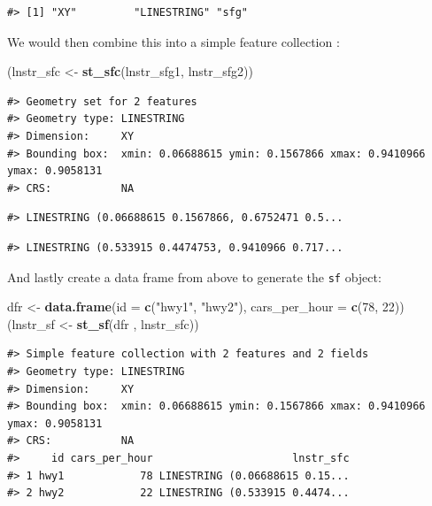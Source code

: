 \documentclass[
]{book}
\newenvironment{Shaded}{\begin{snugshade}}{\end{snugshade}}
\newcommand{\AttributeTok}[1]{\textcolor[rgb]{0.13,0.29,0.53}{#1}}
\newcommand{\DecValTok}[1]{\textcolor[rgb]{0.00,0.00,0.81}{#1}}
\newcommand{\FunctionTok}[1]{\textcolor[rgb]{0.13,0.29,0.53}{\textbf{#1}}}
\newcommand{\NormalTok}[1]{#1}
\newcommand{\OtherTok}[1]{\textcolor[rgb]{0.56,0.35,0.01}{#1}}
\newcommand{\StringTok}[1]{\textcolor[rgb]{0.31,0.60,0.02}{#1}}
\begin{document}
\begin{verbatim}
#> [1] "XY"         "LINESTRING" "sfg"
\end{verbatim}

We would then combine this into a simple feature collection :

\begin{Shaded}
\begin{Highlighting}[]
\NormalTok{(lnstr\_sfc }\OtherTok{\textless{}{-}} \FunctionTok{st\_sfc}\NormalTok{(lnstr\_sfg1, lnstr\_sfg2)) }
\end{Highlighting}
\end{Shaded}

\begin{verbatim}
#> Geometry set for 2 features 
#> Geometry type: LINESTRING
#> Dimension:     XY
#> Bounding box:  xmin: 0.06688615 ymin: 0.1567866 xmax: 0.9410966 ymax: 0.9058131
#> CRS:           NA
\end{verbatim}

\begin{verbatim}
#> LINESTRING (0.06688615 0.1567866, 0.6752471 0.5...
\end{verbatim}

\begin{verbatim}
#> LINESTRING (0.533915 0.4474753, 0.9410966 0.717...
\end{verbatim}

And lastly create a data frame from above to generate the \texttt{sf} object:

\begin{Shaded}
\begin{Highlighting}[]
\NormalTok{dfr }\OtherTok{\textless{}{-}} \FunctionTok{data.frame}\NormalTok{(}\AttributeTok{id =} \FunctionTok{c}\NormalTok{(}\StringTok{"hwy1"}\NormalTok{, }\StringTok{"hwy2"}\NormalTok{), }
                  \AttributeTok{cars\_per\_hour =} \FunctionTok{c}\NormalTok{(}\DecValTok{78}\NormalTok{, }\DecValTok{22}\NormalTok{))}
\NormalTok{(lnstr\_sf }\OtherTok{\textless{}{-}} \FunctionTok{st\_sf}\NormalTok{(dfr , lnstr\_sfc))}
\end{Highlighting}
\end{Shaded}

\begin{verbatim}
#> Simple feature collection with 2 features and 2 fields
#> Geometry type: LINESTRING
#> Dimension:     XY
#> Bounding box:  xmin: 0.06688615 ymin: 0.1567866 xmax: 0.9410966 ymax: 0.9058131
#> CRS:           NA
#>     id cars_per_hour                      lnstr_sfc
#> 1 hwy1            78 LINESTRING (0.06688615 0.15...
#> 2 hwy2            22 LINESTRING (0.533915 0.4474...
\end{verbatim}
\end{document}
